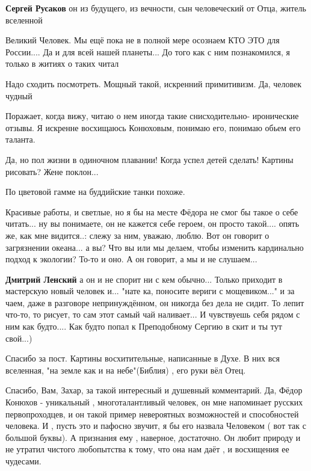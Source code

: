 \begin{itemize}
\begin{itemize} %
\textbf{Сергей Русаков} он из будущего, из вечности, сын человеческий от Отца, житель вселенной
\end{itemize} %


Великий Человек. Мы ещё пока не в полной мере осознаем КТО ЭТО для России....
Да и для всей нашей планеты... До того как с ним познакомился, я только в
житиях о таких читал

Надо сходить посмотреть. Мощный такой, искренний примитивизм. Да, человек чудный


Поражает, когда вижу, читаю о нем иногда такие снисходительно- иронические
отзывы. Я искренне восхищаюсь Конюховым, понимаю его, понимаю обьем его
таланта.


Да, но пол жизни в одиночном плавании! Когда успел детей сделать! Картины рисовать? Жене поклон...

По цветовой гамме на буддийские танки похоже.


Красивые работы, и светлые, но я бы на месте Фёдора не смог бы такое о себе
читать... ну вы понимаете, он не кажется себе героем, он просто такой.... опять
же, как мне видится..: слежу за ним, уважаю, люблю. Вот он говорит о
загрязнении океана... а вы? Что вы или мы делаем, чтобы изменить кардинально
подход к экологии? То-то и оно. А он говорит, а мы и не слушаем...

\begin{itemize} %
\textbf{Дмитрий Ленский} а он и не спорит ни с кем обычно... Только приходит в мастерскую новый человек и... "нате ка, поносите вериги с мощевиком..." и за чаем, даже в разговоре непринуждённом, он никогда без дела не сидит. То лепит что-то, то рисует, то сам этот самый чай наливает... И чувствуешь себя рядом с ним как будто.... Как будто попал к Преподобному Сергию в скит и ты тут свой...)
\end{itemize} %

Спасибо за пост. Картины восхитительные, написанные в Духе. В них вся
вселенная, "на земле как и на небе"(Библия) , его руки вёл Отец.


Спасибо, Вам, Захар, за такой интересный и душевный комментарий. Да, Фёдор
Конюхов - уникальный , многоталантливый человек, он мне напоминает русских
первопроходцев, и он такой пример невероятных возможностей и способностей
человека. И , пусть это и пафосно звучит, я бы его назвала Человеком ( вот так
с большой буквы). А признания ему , наверное, достаточно. Он любит природу и не
утратил чистого любопытства к тому, что она нам даёт , и восхищения ее
чудесами.


\end{itemize}

